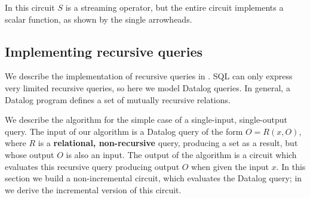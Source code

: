 In this circuit $S$ is a streaming operator, but the entire circuit
implements a scalar function, as shown by the single arrowheads.


\subsection{Implementing recursive queries}\label{sec:datalog}

We describe the implementation of recursive queries in \dbsp.  SQL can
only express very limited recursive queries, so here we model Datalog
queries.  In general, a Datalog program defines a set of mutually
recursive relations.

We describe the algorithm for the simple case of a single-input,
single-output query.  The input of our algorithm is a Datalog query of
the form $O = R(x, O)$, where $R$ is a \textbf{relational,
  non-recursive} query, producing a set as a result, but whose output
$O$ is also an input.  The output of the algorithm is a \dbsp circuit
which evaluates this recursive query producing output $O$ when given
the input $x$.  In this section we build a non-incremental circuit,
which evaluates the Datalog query; in  we derive
the incremental version of this circuit.

